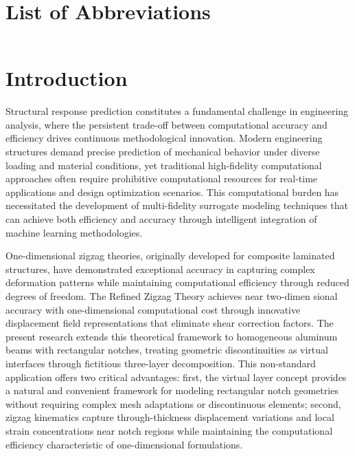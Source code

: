 \documentclass[12pt,a4paper]{report}
\begin{document}
\tableofcontents
\newpage

\listoffigures
\newpage

\listoftables
\newpage

\chapter*{List of Abbreviations}
\begin{tabular}{ll}
\end{tabular}
\newpage

\setcounter{page}{1}

\chapter{Introduction}
\label{chap:introduction}

Structural response prediction constitutes a fundamental challenge in engineering analysis, where the persistent trade-off between computational accuracy and efficiency drives continuous methodological innovation. Modern engineering structures demand precise prediction of mechanical behavior under diverse loading and material conditions, yet traditional high-fidelity computational approaches often require prohibitive computational resources for real-time applications and design optimization scenarios. This computational burden has necessitated the development of multi-fidelity surrogate modeling techniques that can achieve both efficiency and accuracy through intelligent integration of machine learning methodologies.

One-dimensional zigzag theories, originally developed for composite laminated structures, have demonstrated exceptional accuracy in capturing complex deformation patterns while maintaining computational efficiency through reduced degrees of freedom. The Refined Zigzag Theory achieves near two-dimen
sional accuracy with one-dimensional computational cost through innovative displacement field representations that eliminate shear correction factors. The present research extends this theoretical framework to homogeneous aluminum beams with rectangular notches, treating geometric discontinuities as virtual interfaces through fictitious three-layer decomposition. This non-standard application offers two critical advantages: first, the virtual layer concept provides a natural and convenient framework for modeling rectangular notch geometries without requiring complex mesh adaptations or discontinuous elements; second, zigzag kinematics capture through-thickness displacement variations and local strain concentrations near notch regions while maintaining the computational efficiency characteristic of one-dimensional formulations.
\end{document}
